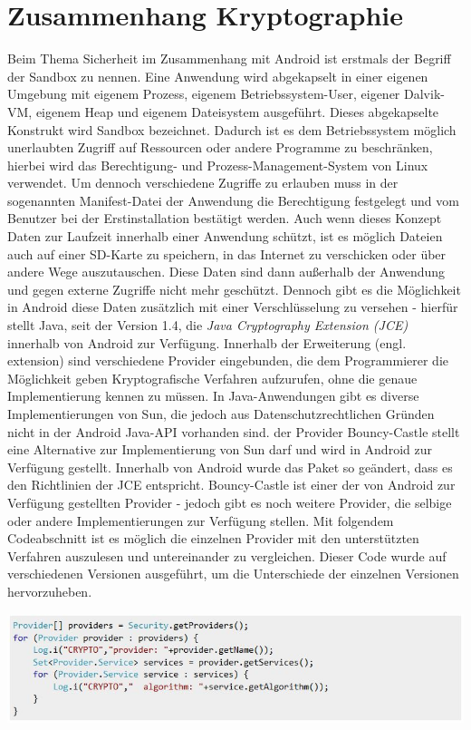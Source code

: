 \documentclass[10pt, a4paper]{scrreprt}
\begin{document}
\section{Zusammenhang Kryptographie}
Beim Thema Sicherheit im Zusammenhang mit Android ist erstmals der Begriff der Sandbox zu nennen. Eine Anwendung wird abgekapselt in einer eigenen Umgebung mit eigenem Prozess, eigenem Betriebssystem-User, eigener Dalvik-VM, eigenem Heap und eigenem Dateisystem ausgeführt. Dieses abgekapselte Konstrukt wird Sandbox bezeichnet. Dadurch ist es dem Betriebssystem möglich unerlaubten Zugriff auf Ressourcen oder andere Programme zu beschränken, hierbei wird das Berechtigung- und Prozess-Management-System von Linux verwendet. %
Um dennoch verschiedene Zugriffe zu erlauben muss in der sogenannten Manifest-Datei der Anwendung die Berechtigung festgelegt und vom Benutzer bei der Erstinstallation bestätigt werden.
Auch wenn dieses Konzept Daten zur Laufzeit innerhalb einer Anwendung schützt, ist es möglich Dateien auch auf einer SD-Karte zu speichern, in das Internet zu verschicken oder über andere Wege auszutauschen. Diese Daten sind dann außerhalb der Anwendung und gegen externe Zugriffe nicht mehr geschützt.
Dennoch gibt es die Möglichkeit in Android diese Daten zusätzlich mit einer Verschlüsselung zu versehen - hierfür stellt Java, seit der Version 1.4, die \textit{Java Cryptography Extension (JCE)} innerhalb von Android zur Verfügung. Innerhalb der Erweiterung (engl. extension) sind verschiedene Provider eingebunden, die dem Programmierer die Möglichkeit geben Kryptografische Verfahren aufzurufen, ohne die genaue Implementierung kennen zu müssen. In Java-Anwendungen gibt es diverse Implementierungen von Sun, die jedoch aus Datenschutzrechtlichen Gründen nicht in der Android Java-API vorhanden sind. der Provider Bouncy-Castle stellt eine Alternative zur Implementierung von Sun darf und wird in Android zur Verfügung gestellt. Innerhalb von Android wurde das Paket so geändert, dass es den Richtlinien der JCE entspricht. 
Bouncy-Castle ist einer der von Android zur Verfügung gestellten Provider - jedoch gibt es noch weitere Provider, die selbige oder andere Implementierungen zur Verfügung stellen. Mit folgendem Codeabschnitt ist es möglich die einzelnen Provider mit den unterstützten Verfahren auszulesen und untereinander zu vergleichen. Dieser Code wurde auf verschiedenen Versionen ausgeführt, um die Unterschiede der einzelnen Versionen hervorzuheben. \\
\begin{center}
\includegraphics[scale=0.8]{read_cryptoprovider.JPG} %
\end{center}
\end{document}
